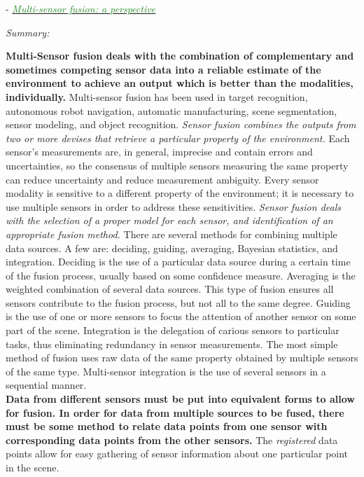 \documentclass[]{article}
\newcommand{\paperentry}[4]{
            \hangindent=1cm
            \cite{#1} - \href{run:../References/#3}{\textcolor{ForestGreen}{\textit{#2}}}
            
            \noindent            
            \begin{minipage}[t]{0.1\linewidth}\hfill\end{minipage}
            \begin{minipage}[t]{0.8\linewidth}\textcolor{NavyBlue}{{\textit{Summary:}}}#4\end{minipage}
            \vspace{.25cm}
          }
\begin{document}
			
			\paperentry{hackett1990multisensorfusion}
			{Multi-sensor fusion: a perspective}
			{Fusion/Reviews/hackett1990multisensorfusion.pdf}
			{}\newline
			\textbf{Multi-Sensor fusion deals with the combination of complementary and sometimes competing sensor data into a reliable estimate of the environment to achieve an output which is better than the modalities, individually.}  Multi-sensor fusion has been used  in target recognition, autonomous robot navigation, automatic manufacturing, scene segmentation, sensor modeling, and object recognition.  \textit{Sensor fusion combines the outputs from two or more devises that retrieve a particular property of the environment.}  Each sensor's measurements are, in general, imprecise and contain errors and uncertainties, so the consensus of multiple sensors measuring the same property can reduce uncertainty and reduce measurement ambiguity. Every sensor modality is sensitive to a different property of the environment; it is necessary to use multiple sensors in order to address these sensitivities. \textit{Sensor fusion deals with the selection of a proper model  for each sensor, and identification of an appropriate fusion method.}  There are several methods for combining multiple data sources.  A few are: deciding, guiding, averaging, Bayesian statistics, and integration.  Deciding is the use of a particular data source during a certain time of the fusion process, usually based on some confidence measure.  Averaging is the weighted combination of several data sources. This type of fusion ensures all sensors contribute to the fusion process, but not all to the same degree.  Guiding is the use of one or more sensors to focus the attention of another sensor on some part of the scene.  Integration is the  delegation of carious sensors to particular tasks, thus eliminating redundancy in sensor measurements.  The most simple method of fusion uses raw data of the same property obtained by multiple sensors of the same type.  Multi-sensor integration is the use of several sensors in a sequential manner. \\
			\noindent
			\textbf{Data from different sensors must be put into equivalent forms to allow for fusion.  In order for data from multiple sources to be fused, there must be some method to relate data points from one sensor with corresponding data points from the other sensors.}  The \textit{registered} data points allow for easy gathering of sensor information about one particular point in the scene.  \\
\end{document}
